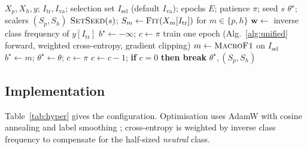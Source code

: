 \documentclass[journal,onecolumn,11pt,draftclsnofoot]{IEEEtran}   %
\begin{document}
\begin{algorithm}[!t]
\caption{Training one fold without leakage}
\label{alg:fit}
\begin{algorithmic}[1]
\Require $X_p,X_h,y$; $I_{\mathrm{tr}},I_{\mathrm{va}}$; selection set
         $I_{\mathrm{sel}}$ (default $I_{\mathrm{va}}$); epochs $E$;
         patience $\pi$; seed $s$
\Ensure $\theta^\star$; scalers $(S_p,S_h)$
\State $\textsc{SetSeed}(s)$;\;
       $S_m \gets \textsc{Fit}(X_m[I_{\mathrm{tr}}])$ for $m\in\{p,h\}$
\State $\mathbf{w} \gets$ inverse class frequency of $y[I_{\mathrm{tr}}]$
\State $b^\star \gets -\infty$;\; $c \gets \pi$
  \State train one epoch (Alg.~\ref{alg:unified} forward, weighted
         cross-entropy, gradient clipping)
  \State $m \gets \textsc{MacroF1}$ on $I_{\mathrm{sel}}$
   \State $b^\star \gets m$;\; $\theta^\star \gets \theta$;\;
      $c \gets \pi$
  \Else \State $c \gets c-1$; \textbf{if} $c=0$ \textbf{then break} \EndIf
\EndFor
\State \Return $\theta^\star,(S_p,S_h)$
\end{algorithmic}
\end{algorithm}

\subsection{Implementation}
Table~\ref{tab:hyper} gives the configuration. Optimisation uses AdamW
\cite{loshchilov2019adamw} with cosine annealing \cite{loshchilov2017sgdr} and
label smoothing \cite{szegedy2016rethinking}; cross-entropy is weighted by
inverse class frequency to compensate for the half-sized \emph{neutral} class.
\end{document}
